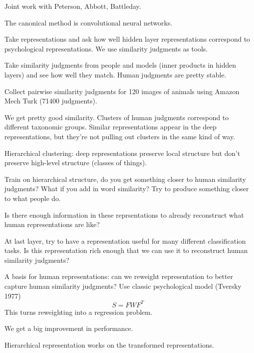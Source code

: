 Joint work with Peterson, Abbott, Battleday.

The canonical method is convolutional neural networks.


Take representations and ask how well hidden layer representations correspond to psychological representations. We use similarity judgments as tools. 

Take similarity judgments from people and models (inner products in hidden layers) and %
see how well they match. Human judgments are pretty stable.

Collect pairwise similarity judgments for 120 images of animals using Amazon Mech Turk (71400 judgments). 



We get pretty good similarity.
Clusters of human judgments correspond to different taxonomic groups. Similar representations appear in the deep representations, but they're not pulling out clusters in the same kind of way. 

Hierarchical clustering: deep representations preserve local structure but don't preserve high-level structure (classes of things). %

Train on hierarchical structure, do you get something closer to human similarity judgments? What if you add in word similarity? Try to produce something closer to what people do.

Is there enough information in these reprsentations to already reconstruct what human representations are like?

At last layer, try to have a representation useful for many different classification tasks. Is this representation rich enough that we can use it to reconstruct human similarity judgments?

A basis for human representations: can we reweight representation to better capture human similarity judgments? Use classic psychological model (Tversky 1977)
$$
S=FWF^T
$$
This turns reweighting into a regression problem. %

We get a big improvement in performance. %

Hierarchical representation works on the transformed representations.

